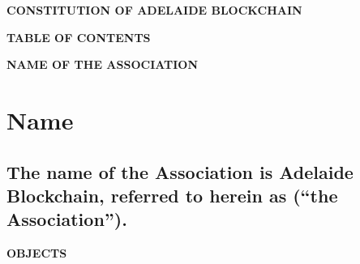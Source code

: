 \documentclass{article}
\newenvironment{subs}
  {\adjustwidth{2em}{0pt}}
  {\endadjustwidth}
\begin{document}
\begin{center}
{\Large\bf CONSTITUTION OF ADELAIDE BLOCKCHAIN \par}
\end{center}
\vspace{10mm}

{\large\bf TABLE OF CONTENTS\par}
\hrulefill

\tableofcontents
\clearpage

{\large\bf NAME OF THE ASSOCIATION\par}
\hrulefill
\section{Name}
\begin{subs}
\subsection{The name of the Association is Adelaide Blockchain, referred to herein as (``the Association'').}
\end{subs}

\vspace{5mm}
{\large\bf OBJECTS\par}
\hrulefill
\vspace{5mm}
\end{document}
